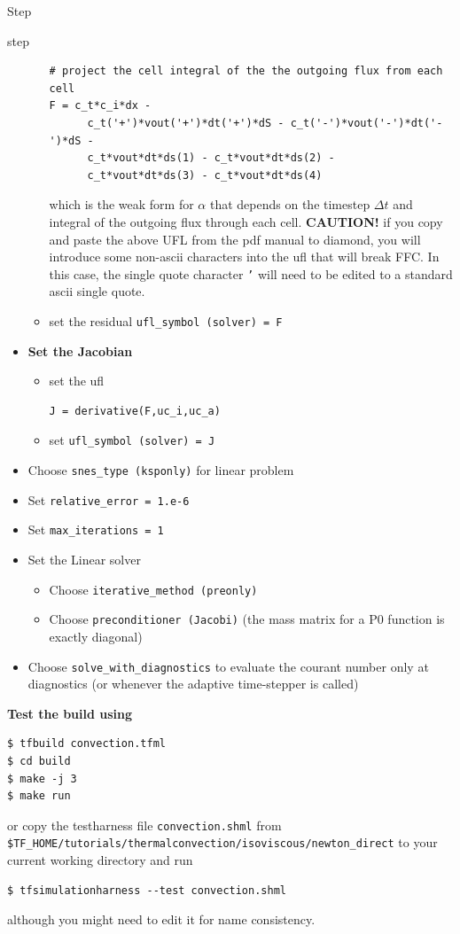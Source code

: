 \begin{steps}{Step}
\begin{steps}{step}
\begin{itemize}
\begin{itemize}
\begin{lstlisting}[style=UFL]
# project the cell integral of the the outgoing flux from each cell
F = c_t*c_i*dx - 
      c_t('+')*vout('+')*dt('+')*dS - c_t('-')*vout('-')*dt('-')*dS - 
      c_t*vout*dt*ds(1) - c_t*vout*dt*ds(2) - 
      c_t*vout*dt*ds(3) - c_t*vout*dt*ds(4)
    \end{lstlisting}
which is the weak form for $\alpha$ that depends on the timestep
$\Delta t$ and integral of the outgoing flux through each cell. \textbf{CAUTION!}
 if you copy and paste the above UFL from the pdf manual to diamond,
 you will introduce some non-ascii characters into the ufl that will
 break FFC.  In this case,  the single quote character \texttt{'} will need to
 be edited to a standard ascii single quote.
\item set the residual \texttt{ufl\_symbol (solver) = F}
\end{itemize}
\item \textbf{Set the Jacobian}
\begin{itemize}
\item set the ufl 
\begin{lstlisting}[style=UFL]
J = derivative(F,uc_i,uc_a)
    \end{lstlisting}
\item set \texttt{ufl\_symbol (solver) = J}
        \end{itemize}
      \item Choose \texttt{snes\_type (ksponly)} for linear problem
      \item Set \texttt{relative\_error = 1.e-6}
      \item Set \texttt{max\_iterations = 1}

      \item Set the Linear solver
        \begin{itemize}
        \item Choose \texttt{iterative\_method (preonly)}
        \item Choose \texttt{preconditioner (Jacobi)} (the mass matrix
          for a P0 function is exactly diagonal)
        \end{itemize}
      \item Choose \texttt{solve\_with\_diagnostics} to evaluate the
        courant number only at diagnostics (or whenever the adaptive
        time-stepper is called)
        \end{itemize}

   \end{steps}
  \item \textbf{Test the build using}
   \begin{lstlisting}[style=Bash]
$ tfbuild convection.tfml
$ cd build
$ make -j 3
$ make run
   \end{lstlisting}
or copy the testharness file \texttt{convection.shml} from
\texttt{\$TF\_HOME/tutorials/thermalconvection/isoviscous/newton\_direct}
to your current working directory and run
\begin{lstlisting}[style=Bash]
  $ tfsimulationharness --test convection.shml 
\end{lstlisting}
although you might need to edit it for name consistency.


\end{steps}
